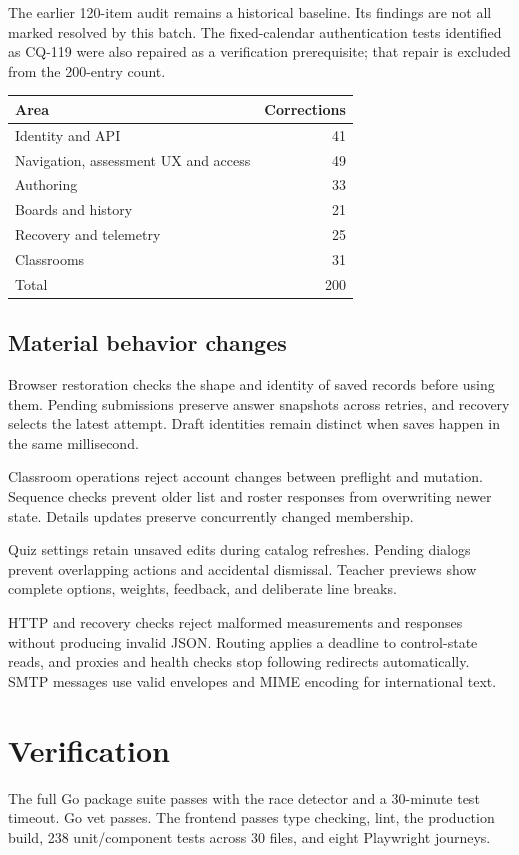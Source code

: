 \documentclass[10pt,a4paper]{article}
\begin{document}
The earlier 120-item audit remains a historical baseline. Its findings are not all marked resolved by this batch. The fixed-calendar authentication tests identified as CQ-119 were also repaired as a verification prerequisite; that repair is excluded from the 200-entry count.

\begin{center}
\begin{tabular}{@{}lr@{}}
\toprule
Area & Corrections\\
\midrule
Identity and API & 41\\
Navigation, assessment UX and access & 49\\
Authoring & 33\\
Boards and history & 21\\
Recovery and telemetry & 25\\
Classrooms & 31\\
\midrule
Total & 200\\
\bottomrule
\end{tabular}
\end{center}

\subsection*{Material behavior changes}
Browser restoration checks the shape and identity of saved records before using them. Pending submissions preserve answer snapshots across retries, and recovery selects the latest attempt. Draft identities remain distinct when saves happen in the same millisecond.

Classroom operations reject account changes between preflight and mutation. Sequence checks prevent older list and roster responses from overwriting newer state. Details updates preserve concurrently changed membership.

Quiz settings retain unsaved edits during catalog refreshes. Pending dialogs prevent overlapping actions and accidental dismissal. Teacher previews show complete options, weights, feedback, and deliberate line breaks.

HTTP and recovery checks reject malformed measurements and responses without producing invalid JSON. Routing applies a deadline to control-state reads, and proxies and health checks stop following redirects automatically. SMTP messages use valid envelopes and MIME encoding for international text.

\section{Verification}
The full Go package suite passes with the race detector and a 30-minute test timeout. Go vet passes. The frontend passes type checking, lint, the production build, 238 unit/component tests across 30 files, and eight Playwright journeys.
\end{document}
